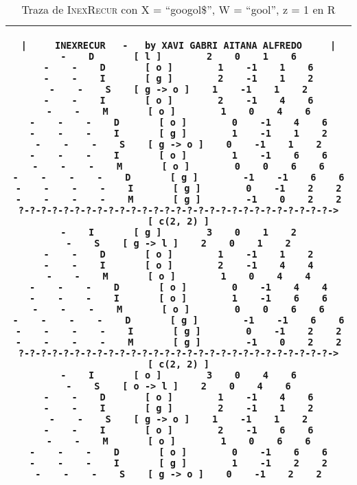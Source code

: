 \documentclass{article}
\newcommand{\tempcaption}{}
\newenvironment{code}[4]
{
\begin{table}[h!]
\gdef\tempcaption{Traza de \textsc{InexRecur} con X = ``#1'', W = ``#2'', z = #3 en #4}
\centering
\begin{tabular}{|c|}
\hline
}
{
\\\hline
\end{tabular}
\caption{\tempcaption}
\end{table}
}
\begin{document}
\begin{code}{googol\$}{gool}{1}{R}
\begin{lstlisting}
|     INEXRECUR   -   by XAVI GABRI AITANA ALFREDO     |
-    D       [ l ]        2    0    1    6
-    -    D       [ o ]        1    -1    1    6
-    -    I       [ g ]        2    -1    1    2
-    -    S    [ g -> o ]    1    -1    1    2
-    -    I       [ o ]        2    -1    4    6
-    -    M       [ o ]        1    0    4    6
-    -    -    D       [ o ]        0    -1    4    6
-    -    -    I       [ g ]        1    -1    1    2
-    -    -    S    [ g -> o ]    0    -1    1    2
-    -    -    I       [ o ]        1    -1    6    6
-    -    -    M       [ o ]        0    0    6    6
-    -    -    -    D       [ g ]        -1    -1    6    6
-    -    -    -    I       [ g ]        0    -1    2    2
-    -    -    -    M       [ g ]        -1    0    2    2
?-?-?-?-?-?-?-?-?-?-?-?-?-?-?-?-?-?-?-?-?-?-?-?-?-?-?-?->  [ c(2, 2) ]
-    I       [ g ]        3    0    1    2
-    S    [ g -> l ]    2    0    1    2
-    -    D       [ o ]        1    -1    1    2
-    -    I       [ o ]        2    -1    4    4
-    -    M       [ o ]        1    0    4    4
-    -    -    D       [ o ]        0    -1    4    4
-    -    -    I       [ o ]        1    -1    6    6
-    -    -    M       [ o ]        0    0    6    6
-    -    -    -    D       [ g ]        -1    -1    6    6
-    -    -    -    I       [ g ]        0    -1    2    2
-    -    -    -    M       [ g ]        -1    0    2    2
?-?-?-?-?-?-?-?-?-?-?-?-?-?-?-?-?-?-?-?-?-?-?-?-?-?-?-?->  [ c(2, 2) ]
-    I       [ o ]        3    0    4    6
-    S    [ o -> l ]    2    0    4    6
-    -    D       [ o ]        1    -1    4    6
-    -    I       [ g ]        2    -1    1    2
-    -    S    [ g -> o ]    1    -1    1    2
-    -    I       [ o ]        2    -1    6    6
-    -    M       [ o ]        1    0    6    6
-    -    -    D       [ o ]        0    -1    6    6
-    -    -    I       [ g ]        1    -1    2    2
-    -    -    S    [ g -> o ]    0    -1    2    2
\end{lstlisting}
\end{code}
\vfill
\end{document}
